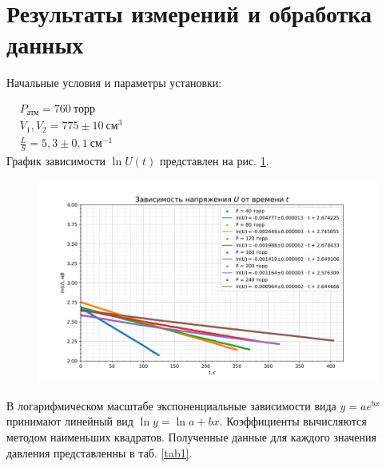 \documentclass[a4paper, 12pt]{article}
\begin{document}
\section{Результаты измерений и обработка данных}

Начальные условия и параметры установки:

$\begin{aligned}
& P_{\text{атм}} = 760~торр\\
& V_1, V_2 = 775\pm10~см^3 \\
& \frac{L}{S} = 5,3\pm0,1~см^{-1}
\end{aligned}$\\[0,5 cm]

График зависимости $\ln{U}(t)$ представлен на рис. \ref{ris6}.

\begin{figure}[h!]
\begin{flushleft}
    \includegraphics[scale=0.75]{2.2.1_1.png}
\end{flushleft}
\caption{}
\label{ris6}
\end{figure}

В логарифмическом масштабе экспоненциальные зависимости вида $y = ae^{bx}$ принимают линейный вид $\ln{y} = \ln{a} + bx$. Коэффициенты вычисляются методом наименьших квадратов. Полученные данные для каждого значения давления представленны в таб. \ref{tab1}.
\end{document}
